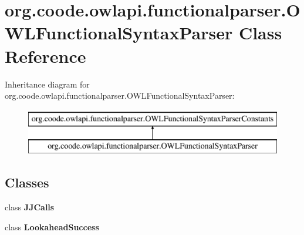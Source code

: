 \hypertarget{classorg_1_1coode_1_1owlapi_1_1functionalparser_1_1_o_w_l_functional_syntax_parser}{\section{org.\-coode.\-owlapi.\-functionalparser.\-O\-W\-L\-Functional\-Syntax\-Parser Class Reference}
\label{classorg_1_1coode_1_1owlapi_1_1functionalparser_1_1_o_w_l_functional_syntax_parser}
}
Inheritance diagram for org.\-coode.\-owlapi.\-functionalparser.\-O\-W\-L\-Functional\-Syntax\-Parser\-:\begin{figure}[H]
\begin{center}
\leavevmode
\includegraphics[height=2.000000cm]{classorg_1_1coode_1_1owlapi_1_1functionalparser_1_1_o_w_l_functional_syntax_parser}
\end{center}
\end{figure}
\subsection*{Classes}
\begin{DoxyCompactItemize}
\item 
class {\bfseries J\-J\-Calls}
\item 
class {\bfseries Lookahead\-Success}
\end{DoxyCompactItemize}
